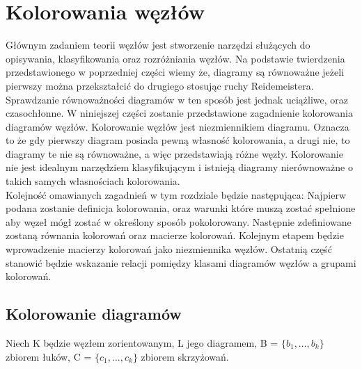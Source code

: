 \section{Kolorowania węzłów}

 Głównym zadaniem teorii węzłów jest stworzenie narzędzi służących do opisywania, klasyfikowania oraz rozróżniania węzłów. Na podstawie twierdzenia przedstawionego w poprzedniej części wiemy że, diagramy są równoważne jeżeli pierwszy można przekształcić do drugiego stosując ruchy Reidemeistera. Sprawdzanie równoważności diagramów w ten sposób jest jednak uciążliwe, oraz czasochłonne.  W niniejszej części zostanie przedstawione zagadnienie kolorowania diagramów węzłów. Kolorowanie węzłów jest niezmiennikiem diagramu. Oznacza to że gdy pierwszy diagram posiada pewną własność kolorowania, a drugi nie, to diagramy te nie są równoważne, a więc przedstawiają różne węzły. Kolorowanie nie jest idealnym narzędziem klasyfikującym i istnieją diagramy nierównoważne o takich samych własnościach kolorowania. \\
 Kolejność omawianych zagadnień w tym rozdziale będzie następująca: Najpierw podana zostanie definicja kolorowania, oraz warunki które muszą zostać spełnione aby węzeł mógł zostać w określony sposób pokolorowany. Następnie zdefiniowane zostaną równania kolorowań oraz macierze kolorowań. Kolejnym etapem będzie wprowadzenie macierzy kolorowań jako niezmiennika węzłów. Ostatnią część stanowić będzie wskazanie relacji pomiędzy klasami diagramów węzłów a grupami kolorowań.

\subsection{Kolorowanie diagramów}

Niech K będzie węzłem zorientowanym, L jego diagramem, B = $\lbrace b_{1}, \ldots, b_{k}\rbrace$ zbiorem łuków,  C = $\lbrace c_{1}, \ldots, c_{k}\rbrace$ zbiorem skrzyżowań. 

